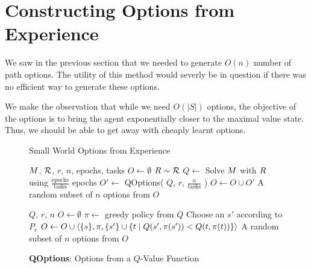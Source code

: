 \section{Constructing Options from Experience} 
\label{sec:algo}

We saw in the previous section that we needed to generate $O(n)$ number
of path options. The utility of this method would severly be in question
if there was no efficient way to generate these options.

We make the observation that while we need $O(|S|)$ options, the
objective of the options is to bring the agent exponentially closer to
the maximal value state. Thus, we should be able to get away with
cheaply learnt options.

\begin{figure*}[ttt!]
  \begin{minipage}[t]{.49\textwidth}
    \begin{algorithm}[H]
      \caption{Small World Options from Experience}
      \label{algo:small-world-experience}
      \begin{algorithmic}[1]
          \REQUIRE $M$, $\mathcal{R}$, $r$, $n$, epochs, tasks
          \STATE $O \gets \emptyset$
            \STATE $R \sim \mathcal{R}$
            \STATE $Q \gets $ Solve $M$ with $R$ using
                $\frac{\textrm{epochs}}{\textrm{tasks}}$ epochs
            \STATE $O' \gets $ QOptions( $Q$, $r$,
                $\frac{n}{\textrm{tasks}}$ )
            \STATE $O \gets O \cup O'$
          \ENDFOR
          \RETURN A random subset of $n$ options from $O$
      \end{algorithmic}
    \end{algorithm}
  \end{minipage}
  \hfill
  \begin{minipage}[t]{.49\textwidth}
    \begin{algorithm}[H]
      \caption{{\bf QOptions}: Options from a $Q$-Value Function}
      \label{algo:qoptions}
      \begin{algorithmic}[1]
          \REQUIRE $Q$, $r$, $n$
          \STATE $O \gets \emptyset$
          \STATE $\pi \gets $ greedy policy from $Q$
            \STATE Choose an $s'$ according to $P_r$
              \STATE $O \gets O \cup \langle \{s\}, \pi, \{s'\} \cup \{t \mid Q(s',\pi(s')) < Q(t, \pi(t))\}  \rangle$
            \ENDIF
          \RETURN A random subset of $n$ options from $O$
      \end{algorithmic}
    \end{algorithm}

  \end{minipage}
  \hfill
\end{figure*} 



